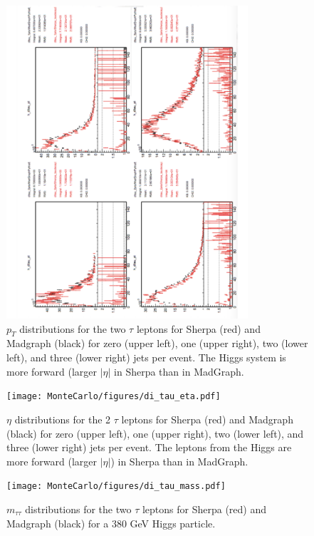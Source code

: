 \begin{figure}
  \center
  \includegraphics[width=0.8\textwidth, angle=270]{MonteCarlo/figures/di_tau_pt.pdf}
  \caption{$p_T$ distributions for the two $\tau$ leptons for Sherpa (red) and Madgraph (black) for zero (upper
  left), one (upper right), two (lower left), and three (lower right) jets per event. 
  The Higgs system is more forward (larger $|\eta|$ in Sherpa than in MadGraph.  \label{fig:di_tau_pt}}
\end{figure}
\begin{figure}
  \center
  \texttt{[image: MonteCarlo/figures/di\_tau\_eta.pdf]}
  \caption{$\eta$ distributions for the 2 $\tau$ leptons for Sherpa (red) and Madgraph (black) for zero (upper
  left), one (upper right), two (lower left), and three (lower right) jets per event. 
  The leptons from the Higgs are more forward (larger $|\eta|$) in Sherpa than in MadGraph.  \label{fig:di_tau_eta}}
\end{figure}
\begin{figure}
  \center
  \texttt{[image: MonteCarlo/figures/di\_tau\_mass.pdf]}
  \caption{$m_{\tau\tau}$ distributions for the two $\tau$ leptons for Sherpa (red) and Madgraph (black) 
  for a 380 GeV Higgs particle.  
  \label{fig:di_tau_mass}}
\end{figure}


